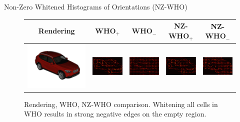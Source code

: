 \documentclass[serif,mathserif,final]{beamer}
\newcommand{\1}{\mathbb{I}} %
\begin{document}
\begin{frame}{}
\begin{columns}[t]
\begin{column}{0.24\linewidth}
\begin{block}{Non-Zero Whitened Histograms of Orientations (NZ-WHO)}
        \begin{figure}[t]
          \begin{center}
            \small
            \setlength\tabcolsep{3pt}
            \begin{tabular}{|c|c|c|c|c|}
              \hline
              Rendering & WHO$_+$ & WHO$_-$  & NZ-WHO$_+$ & NZ-WHO$_-$ \\
              \hline
              \includegraphics[width=0.16\linewidth]{rendering} &
              \includegraphics[width=0.18\linewidth]{whiten_all_crop} &
              \includegraphics[width=0.18\linewidth]{whiten_all_neg_crop}  &
              \includegraphics[width=0.18\linewidth]{whiten_non_zero_crop} &
              \includegraphics[width=0.18\linewidth]{whiten_non_zero_neg} \\
              \hline
            \end{tabular}
          \end{center}
          \caption{Rendering, WHO, NZ-WHO comparison. Whitening all cells in
            WHO results in strong negative edges on the empty region.}
          \label{fig:whocomparison}
        \end{figure}


\end{block}
\end{column}
\end{columns}
\end{frame}
\end{document}
